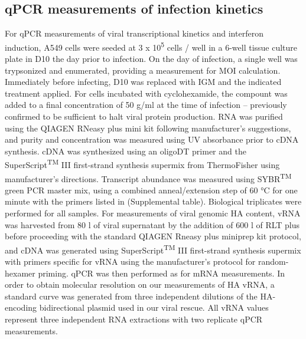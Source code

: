 \documentclass[9pt,lineno]{elife}
\begin{document}
\subsection{qPCR measurements of infection kinetics}
For qPCR measurements of viral transcriptional kinetics and interferon induction, A549 cells were seeded at 3 x 10\textsuperscript{5} cells / well in a 6-well tissue culture plate in D10 the day prior to infection. 
On the day of infection, a single well was trypsonized and enumerated, providing a measurement for MOI calculation.
Immediately before infecting, D10 was replaced with IGM and the indicated treatment applied.
For cells incubated with cyclohexamide, the compount was added to a final concentration of 50  \si{\micro}g/ml at the time of infection -- previously confirmed to be sufficient to halt viral protein production.
RNA was purified using the QIAGEN RNeasy plus mini kit following manufacturer's suggestions, and purity and concentration was measured using UV absorbance prior to cDNA synthesis. 
cDNA was synthesized using an oligoDT primer and the SuperScript\textsuperscript{TM} III first-strand synthesis supermix from ThermoFisher using manufacturer's directions. 
Transcript abundance was measured using SYBR\textsuperscript{TM}  green PCR master mix, using a combined anneal/extension step of 60 \si{\degreeCelsius } for one minute with the primers listed in (Supplemental table).
Biological triplicates were performed for all samples.
For measurements of viral genomic HA content, vRNA was harvested from 80 \si{\micro}l of viral supernatant by the addition of 600 \si{\micro}l of RLT plus before proceeding with the standard QIAGEN Rneasy plus miniprep kit protocol, and cDNA was generated using  SuperScript\textsuperscript{TM} III first-strand synthesis supermix with primers specific for vRNA using the manufacturer's protocol for random-hexamer priming.
qPCR was then performed as for mRNA measurements.
In order to obtain molecular resolution on our measurements of HA vRNA, a standard curve was generated from three independent dilutions of the HA-encoding bidirectional plasmid used in our viral rescue. 
All vRNA values represent three independent RNA extractions with two replicate qPCR measurements. 
\end{document}
